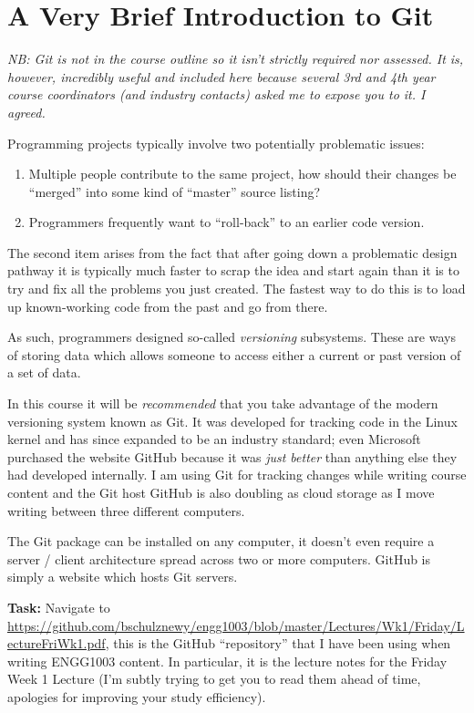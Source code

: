 \documentclass{lab}
\begin{document}
\pagebreak
\section{A Very Brief Introduction to Git}

\textit{NB: Git is not in the course outline so it isn't strictly required nor assessed. It is, however, incredibly useful and included here because several 3rd and 4th year course coordinators (and industry contacts) asked me to expose you to it. I agreed.}

Programming projects typically involve two potentially problematic issues:

\begin{enumerate}
	\item Multiple people contribute to the same project, how should their changes be ``merged'' into some kind of ``master'' source listing?
	\item Programmers frequently want to ``roll-back'' to an earlier code version.
\end{enumerate}

The second item arises from the fact that after going down a problematic design pathway it is typically much faster to scrap the idea and start again than it is to try and fix all the problems you just created. The fastest way to do this is to load up known-working code from the past and go from there.

As such, programmers designed so-called \textit{versioning} subsystems. These are ways of storing data which allows someone to access either a current or past version of a set of data.

In this course it will be \textit{recommended} that you take advantage of the modern versioning system known as Git. It was developed for tracking code in the Linux kernel and has since expanded to be an industry standard; even Microsoft purchased the website GitHub because it was \textit{just better} than anything else they had developed internally. I am using Git for tracking changes while writing course content and the Git host GitHub is also doubling as cloud storage as I move writing between three different computers.

The Git package can be installed on any computer, it doesn't even require a server / client architecture spread across two or more computers. GitHub is simply a website which hosts Git servers.

\textbf{Task:} Navigate to \url{https://github.com/bschulznewy/engg1003/blob/master/Lectures/Wk1/Friday/LectureFriWk1.pdf}, this is the GitHub ``repository'' that I have been using when writing ENGG1003 content. In particular, it is the lecture notes for the Friday Week 1 Lecture (I'm subtly trying to get you to read them ahead of time, apologies for improving your study efficiency).
\end{document}
